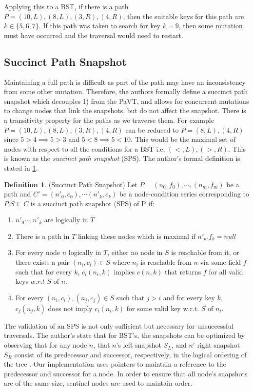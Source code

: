 \documentclass[conference]{IEEEtran}
\theoremstyle{definition}
\newtheorem{definition}{Definition}[section]
\theoremstyle{theorem}
\begin{document}
Applying this to a BST, if there is a path $P=(10,L),(8,L),(3,R),(4,R)$, then the suitable keys for this path are $k\in\{5, 6, 7\}$. If this path was taken to search for key $k=9$, then some mutation must have occurred and the traversal would need to restart.   

\subsection{Succinct Path Snapshot}
Maintaining a full path is difficult as part of the path may have an inconsistency from some other mutation. Therefore, the authors formally define a succinct path snapshot which decouples 1) from the PaVT, and allows for concurrent mutations to change nodes that link the snapshots, but do not affect the snapshot. There is a transitivity property for the paths as we traverse them. For example $P=(10,L),(8,L),(3,R),(4,R)$  can be reduced to $P=(8,L),(4,R)$ since $5>4 \implies 5 > 3$  and $5<8 \implies 5<10$. This would be the maximal set of nodes with respect to all the conditions for a BST i.e, $(<,L), (>, R)$. This is known as the \textit{succinct path snapshot} (SPS). The author's formal definition is stated in \ref{def:def1}.
\theoremstyle{definition}
\begin{definition}{(Succinct Path Snapshot)} Let $P = (n_0, f_0),\cdots,(n_m, f_m)$ be a path and $C'=(n'_0, c_0),\cdots (n'_k, c_k)$ be a node-condition series corresponding to $P.S\subseteq C$ is a succinct path snapshot (SPS) of P if:
\begin{enumerate}
	\item $n'_0\cdots, n'_k$ are logically in $T$
	\item There is a path in $T$ linking these nodes which is maximal if $n'_k.f_k = null$
	\item For every node $n$ logically in $T$, either no node in $S$ is reachable from it, or there exists a pair $(n_i, c_i) \in S$ where $n_i$ is reachable from $n$ via some field $f$ such that for every $k$, $c_i(n_i, k)$ implies $c(n, k)$ that returns $f$ for all valid keys $w.r.t$ $S$ of $n$.
	\item For every $(n_i, c_i), (n_j, c_j) \in S$ such that $j > i$ and for every key $k$, $c_j(n_j, k)$ does not imply $c_i(n_i, k)$ for some valid key w.r.t. $S$ of $n_i$.
\end{enumerate}
\label{def:def1}
\end{definition}
The validation of an SPS is not only sufficient but necessary for unsuccessful traversals. The author's state that for BST's, the snapshots can be optimized by observing that for any node $n$, that $n$'s left snapshot $S_L$, and $n$' right snapshot $S_R$ consist of its predecessor and successor, respectively,  in the logical ordering of the tree \cite{draschler-lo}. Our implementation uses pointers to maintain a reference to the predecessor and successor for a node. In order to ensure that all node's snapshots are of the same size, sentinel nodes are used to maintain order.
\end{document}
